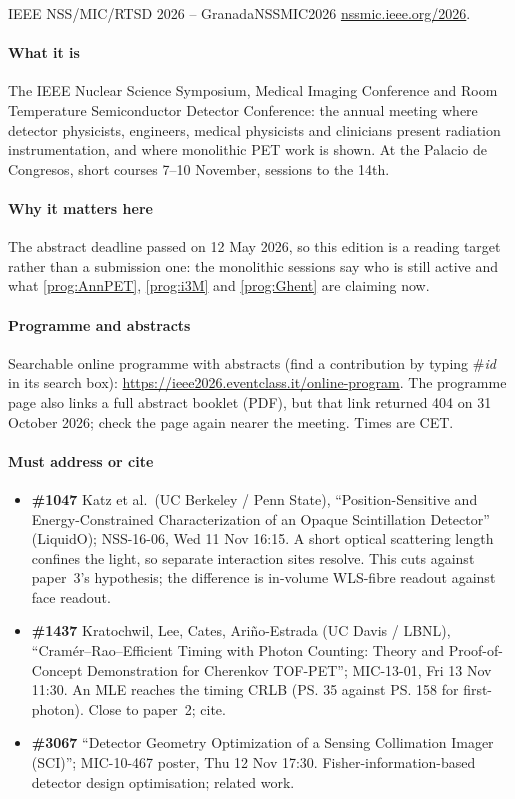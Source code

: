 \begin{confnote}{IEEE NSS/MIC/RTSD 2026 -- Granada}{NSSMIC2026}
\href{https://nssmic.ieee.org/2026/}{nssmic.ieee.org/2026}.

\paragraph{What it is}
The IEEE Nuclear Science Symposium, Medical Imaging Conference and Room
Temperature Semiconductor Detector Conference: the annual meeting where
detector physicists, engineers, medical physicists and clinicians present
radiation instrumentation, and where monolithic PET work is shown.
At the Palacio de Congresos, short courses 7--10 November, sessions to the
14th.

\paragraph{Why it matters here}
The abstract deadline passed on 12 May 2026, so this edition is a reading
target rather than a submission one: the monolithic sessions say who is
still active and what \ref{prog:AnnPET}, \ref{prog:i3M} and \ref{prog:Ghent}
are claiming now.

\paragraph{Programme and abstracts}
Searchable online programme with abstracts (find a contribution by typing \#\textit{id} in its search box): \url{https://ieee2026.eventclass.it/online-program}.
The programme page also links a full abstract booklet (PDF), but that link returned 404 on 31 October 2026; check the page again nearer the meeting.
Times are CET.

\paragraph{Must address or cite}
\begin{itemize}
	\item \textbf{\#1047} Katz et al.\ (UC Berkeley / Penn State), ``Position-Sensitive and Energy-Constrained Characterization of an Opaque Scintillation Detector'' (LiquidO); NSS-16-06, Wed 11 Nov 16:15.
		A short optical scattering length confines the light, so separate interaction sites resolve.
		This cuts against paper~3's hypothesis; the difference is in-volume WLS-fibre readout against face readout.
	\item \textbf{\#1437} Kratochwil, Lee, Cates, Ariño-Estrada (UC Davis / LBNL), ``Cramér--Rao--Efficient Timing with Photon Counting: Theory and Proof-of-Concept Demonstration for Cherenkov TOF-PET''; MIC-13-01, Fri 13 Nov 11:30.
		An MLE reaches the timing CRLB (\ps{35} against \ps{158} for first-photon).
		Close to paper~2; cite.
	\item \textbf{\#3067} ``Detector Geometry Optimization of a Sensing Collimation Imager (SCI)''; MIC-10-467 poster, Thu 12 Nov 17:30.
		Fisher-information-based detector design optimisation; related work.
\end{itemize}


\end{confnote}

